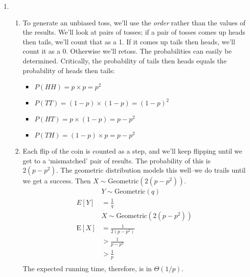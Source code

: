 \documentclass{article}
\begin{document}
\begin{enumerate}
\item
    \begin{enumerate}
    \item To generate an unbiased toss, we'll use the \textit{order} rather than the values of the results. We'll look at pairs of tosses; if a pair of tosses comes up heads then tails, we'll count that as a 1. If it comes up tails then heads, we'll count it as a 0. Otherwise we'll retoss. The probabilities can easily be determined. Critically, the probability of tails then heads equals the probability of heads then tails:
        \begin{itemize}
        \item $P(HH) = p \times p = p^2$
        \item $P(TT) = (1 - p) \times (1 - p) = (1 - p)^2$
        \item $P(HT) = p \times (1 - p) = p - p^2$
        \item $P(TH) = (1 - p) \times p = p - p^2$
        \end{itemize}
    \item Each flip of the coin is counted as a step, and we'll keep flipping until we get to a `mismatched' pair of results. The probability of this is $2(p - p^2)$. The geometric distribution models this well--we do trails until we get a success. Then $X \sim \text{Geometric}(2(p - p^2))$.
        \begin{equation*}
        \begin{aligned}
        & Y \sim \text{Geometric}(q) \\
            E[Y] &= \frac{1}{q} \\
        & X \sim \text{Geometric}(2(p - p^2)) \\
            \text{E}[X] &= \frac{1}{2(p - p^2)} \\
            &> \frac{1}{p - p^2} \\
            &> \frac{1}{p} \\
        \end{aligned}
        \end{equation*}
        The expected running time, therefore, is in $\Theta(1 / p)$.
    \end{enumerate}


\end{enumerate}
\end{document}
